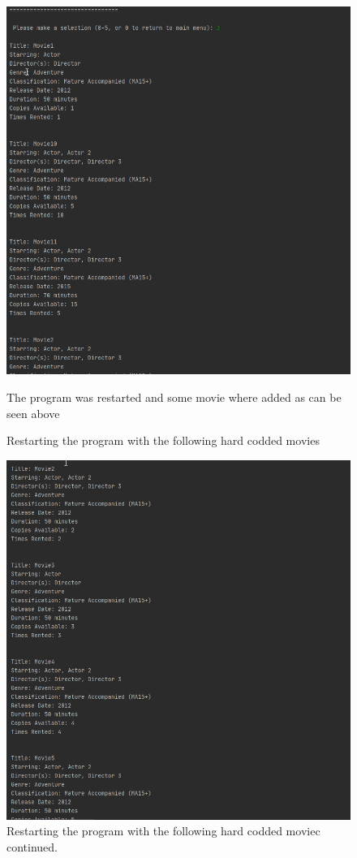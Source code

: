\documentclass[a4paper,12pt]{article}
\begin{document}
\begin{figure}[!htb]
\centering
\includegraphics[width=1\textwidth]{15}
\caption{Restarting the program with the following hard codded movies}
\medskip
\small
The program was restarted and some movie where added as can be seen above
\end{figure}


\begin{figure}[!htb]
\centering
\includegraphics[width=1\textwidth]{16}
\caption{Restarting the program with the following hard codded moviec continued.}
\medskip
\small
\end{figure}
\end{document}
